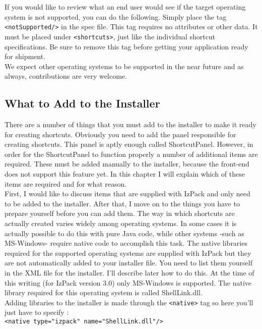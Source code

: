 If you would like to review what an end user would see if the target
operating system is not supported, you can do the following. Simply
place the tag \texttt{<notSupported/>} in the spec file. This tag requires no
attributes or other data. It must be placed under \texttt{<shortcuts>}, just like
the individual shortcut specifications. Be sure to remove this tag
before getting your application ready for shipment.\\

We expect other operating systems to be supported in the near future and
as always, contributions are very welcome.\\

\subsection{What to Add to the Installer}

There are a number of things that you must add to the installer to make
it ready for creating shortcuts. Obviously you need to add the panel
responsible for creating shortcuts. This panel is aptly enough called
ShortcutPanel. However, in order for the ShortcutPanel to function
properly a number of additional items are required. These must be added
manually to the installer, because the front-end does not support this
feature yet. In this chapter I will explain which of these items are
required and for what reason.\\

First, I would like to discuss items that are supplied with IzPack and
only need to be added to the installer. After that, I move on to the
things you have to prepare yourself before you can add them. The way in
which shortcuts are actually created varies widely among operating
systems. In some cases it is actually possible to do this with pure Java
code, while other systems -such as MS-Windows- require native code to
accomplish this task. The native libraries required for the supported
operating systems are supplied with IzPack but they are not
automatically added to your installer file. You need to list them
yourself in the XML file for the installer. I'll describe later how to
do this. At the time of this writing (for IzPack version 3.0) only
MS-Windows is supported. The native library required for this operating
system is called ShellLink.dll.\\

Adding libraries to the installer is made through the \texttt{<native>} tag so
here you'll just have to specify :\\
\texttt{<native type="izpack" name="ShellLink.dll"/>}\\

